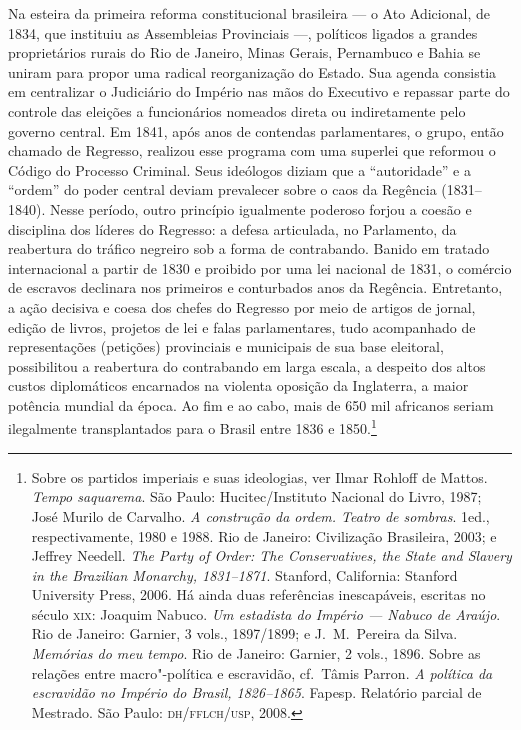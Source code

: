  Na esteira da primeira reforma constitucional brasileira --- o Ato
Adicional, de 1834, que instituiu as Assembleias Provinciais ---,
políticos ligados a grandes proprietários rurais do Rio de Janeiro,
Minas Gerais, Pernambuco e Bahia se uniram para propor uma radical
reorganização do Estado. Sua agenda consistia em centralizar o
Judiciário do Império nas mãos do Executivo e repassar parte do
controle das eleições a funcionários nomeados direta ou indiretamente
pelo governo central. Em 1841, após anos de contendas parlamentares, o
grupo, então chamado de Regresso, realizou esse programa com uma
superlei que reformou o Código do Processo Criminal. Seus ideólogos
diziam que a ``autoridade'' e a ``ordem'' do poder central deviam
prevalecer sobre o caos da Regência (1831--1840). Nesse período, outro
princípio igualmente poderoso forjou a coesão e disciplina dos líderes
do Regresso: a defesa articulada, no Parlamento, da reabertura do
tráfico negreiro sob a forma de contrabando. Banido em tratado
internacional a partir de 1830 e proibido por uma lei nacional de 1831,
o comércio de escravos declinara nos primeiros e conturbados anos da
Regência. Entretanto, a ação decisiva e coesa dos chefes do Regresso
por meio de artigos de jornal, edição de livros, projetos de lei e
falas parlamentares, tudo acompanhado de representações (petições)
provinciais e municipais de sua base eleitoral, possibilitou a
reabertura do contrabando em larga escala, a despeito dos altos custos
diplomáticos encarnados na violenta oposição da Inglaterra, a maior
potência mundial da época. Ao fim e ao cabo, mais de 650 mil africanos
seriam ilegalmente transplantados para o Brasil entre 1836 e
1850.\footnote{ Sobre os partidos imperiais e suas ideologias, ver
Ilmar Rohloff de Mattos. \textit{Tempo saquarema}. São Paulo:
Hucitec/Instituto Nacional do Livro, 1987; José Murilo de Carvalho.
\textit{A construção da ordem. Teatro de sombras}. 1\ai ed.,
respectivamente, 1980 e 1988. Rio de Janeiro: Civilização Brasileira,
2003; e Jeffrey Needell. \textit{The Party of Order: The Conservatives,
the State and Slavery in the Brazilian Monarchy, 1831--1871}.
Stanford, California: Stanford University Press, 2006. Há ainda duas
referências inescapáveis, escritas no século \textsc{xix}: Joaquim Nabuco.
\textit{Um estadista do Império --- Nabuco de Araújo}. Rio de Janeiro:
Garnier, 3 vols., 1897/1899; e J.~M.~Pereira da Silva. \textit{Memórias
do meu tempo}. Rio de Janeiro: Garnier, 2 vols., 1896. Sobre as
relações entre macro"-política e escravidão, cf.~Tâmis Parron.
\textit{A política da escravidão no Império do Brasil, 1826--1865}.
Fapesp. Relatório parcial de Mestrado. São Paulo: \textsc{dh/fflch/usp}, 2008.} 

